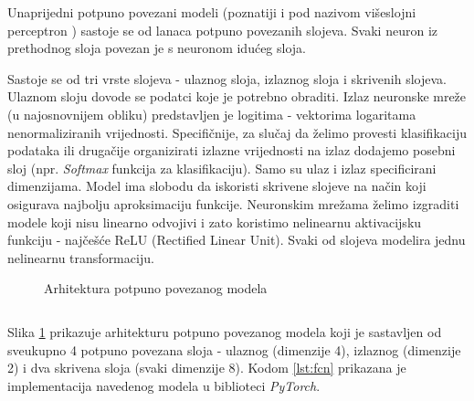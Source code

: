 Unaprijedni potpuno povezani modeli  (poznatiji i pod nazivom višeslojni perceptron ) sastoje se od lanaca potpuno povezanih slojeva. Svaki neuron iz prethodnog sloja povezan je s neuronom idućeg sloja. 

Sastoje se od tri vrste slojeva - ulaznog sloja, izlaznog sloja i skrivenih slojeva. Ulaznom sloju dovode se podatci koje je potrebno obraditi. Izlaz neuronske mreže (u najosnovnijem obliku) predstavljen je logitima  - vektorima logaritama nenormaliziranih vrijednosti. Specifičnije, za slučaj da želimo provesti klasifikaciju podataka ili drugačije organizirati izlazne vrijednosti na izlaz dodajemo posebni sloj (npr. \textit{Softmax} funkcija za klasifikaciju). Samo su ulaz i izlaz specificirani dimenzijama. Model ima slobodu da iskoristi skrivene slojeve na način koji osigurava najbolju aproksimaciju funkcije. Neuronskim mrežama želimo izgraditi modele koji nisu linearno odvojivi i zato koristimo nelinearnu aktivacijsku funkciju - najčešće ReLU (Rectified Linear Unit). Svaki od slojeva modelira jednu nelinearnu transformaciju.

\begin{figure}[H]
    \centering
    \caption{Arhitektura potpuno povezanog modela}
    \label{fig:nn}
\end{figure}

\begin{listing}[H]
    \caption{Implementacija potpuno povezanog modela na slici \ref{fig:nn} koristeći biblioteku \textit{PyTorch}}
    \inputminted{python}{snippets/fcn.py}
    \label{lst:fcn}
\end{listing}

Slika \ref{fig:nn} \cite{NNsvg} prikazuje arhitekturu potpuno povezanog modela koji je sastavljen od sveukupno 4 potpuno povezana sloja - ulaznog (dimenzije 4), izlaznog (dimenzije 2) i dva skrivena sloja (svaki dimenzije 8). Kodom \ref{lst:fcn} prikazana je implementacija navedenog modela u biblioteci \textit{PyTorch}.


